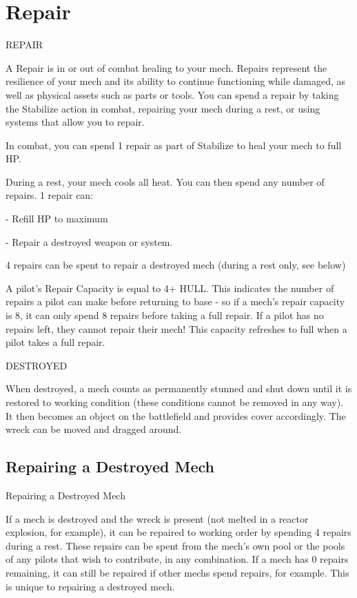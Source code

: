 \section{Repair}

                                               REPAIR  

A Repair is in or out of combat healing to your mech. Repairs represent the resilience of your  
mech and its ability to continue functioning while damaged, as well as physical assets such as  
parts or tools. You can spend a repair by taking the Stabilize action in combat, repairing your  
mech during a rest, or using systems that allow you to repair.
 

In combat, you can spend 1 repair as part of Stabilize to heal your mech to full HP.
 

During a rest, your mech cools all heat. You can then spend any number of repairs. 1 repair can:
 
    -    Refill HP to maximum
 
    -    Repair a destroyed weapon or system.
 
4 repairs can be spent to repair a destroyed mech (during a rest only, see below)
 

A pilot’s Repair Capacity is equal to 4+ HULL. This indicates the number of repairs a pilot can  
make before returning to base - so if a mech’s repair capacity is 8, it can only spend 8 repairs  
before taking a full repair. If a pilot has no repairs left, they cannot repair their mech! This  
capacity refreshes to full when a pilot takes a full repair.
 

                                                 DESTROYED  

When destroyed, a mech counts as permanently stunned and shut down until it is restored to  
working condition (these conditions cannot be removed in any way). It then becomes an object  
on the battlefield and provides cover accordingly. The wreck can be moved and dragged around.
 
\subsection{Repairing a Destroyed Mech}
                                  Repairing a Destroyed Mech  

If a mech is destroyed and the wreck is present (not melted in a reactor explosion, for example), it  
can be repaired to working order by spending 4 repairs during a rest. These repairs can be spent  
from the mech’s own pool or the pools of any pilots that wish to contribute, in any combination. If a  
mech has 0 repairs remaining, it can still be repaired if other mechs spend repairs, for example.  
This is unique to repairing a destroyed mech.  

